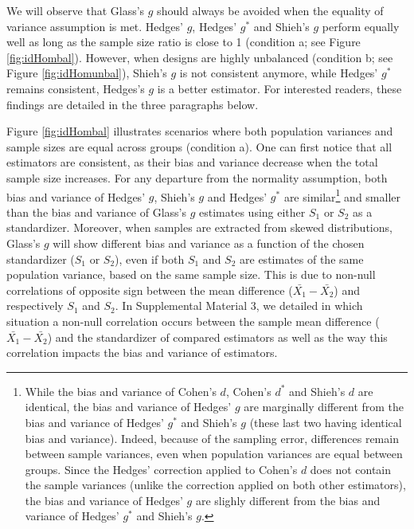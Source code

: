 \documentclass[
  english,
  man]{apa6}
\begin{document}
We will observe that Glass's \(g\) should always be avoided when the equality of variance assumption is met. Hedges' \(g\), Hedges' \(g^*\) and Shieh's \(g\) perform equally well as long as the sample size ratio is close to 1 (condition a; see Figure \ref{fig:idHombal}). However, when designs are highly unbalanced (condition b; see Figure \ref{fig:idHomunbal}), Shieh's \(g\) is not consistent anymore, while Hedges' \(g^*\) remains consistent, Hedges's \(g\) is a better estimator. For interested readers, these findings are detailed in the three paragraphs below.

\newpage

Figure \ref{fig:idHombal} illustrates scenarios where both population variances and sample sizes are equal across groups (condition a). One can first notice that all estimators are consistent, as their bias and variance decrease when the total sample size increases. For any departure from the normality assumption, both bias and variance of Hedges' \(g\), Shieh's \(g\) and Hedges' \(g^*\) are similar\footnote{While the bias and variance of Cohen's $d$, Cohen's $d^*$ and Shieh's $d$ are identical, the bias and variance of Hedges' $g$ are marginally different from the bias and variance of Hedges' $g^*$ and Shieh's $g$ (these last two having identical bias and variance). Indeed, because of the sampling error, differences remain between sample variances, even when population variances are equal between groups. Since the Hedges' correction applied to Cohen's $d$ does not contain the sample variances (unlike the correction applied on both other estimators), the bias and variance of Hedges' $g$ are slighly different from the bias and variance of Hedges' $g^*$ and Shieh's $g$.} and smaller than the bias and variance of Glass's \(g\) estimates using either \(S_1\) or \(S_2\) as a standardizer. Moreover, when samples are extracted from skewed distributions, Glass's \(g\) will show different bias and variance as a function of the chosen standardizer (\(S_1\) or \(S_2\)), even if both \(S_1\) and \(S_2\) are estimates of the same population variance, based on the same sample size. This is due to non-null correlations of opposite sign between the mean difference (\(\bar{X_1}-\bar{X_2}\)) and respectively \(S_1\) and \(S_2\). In Supplemental Material 3, we detailed in which situation a non-null correlation occurs between the sample mean difference (\(\bar{X_1}-\bar{X_2}\)) and the standardizer of compared estimators as well as the way this correlation impacts the bias and variance of estimators.
\end{document}
